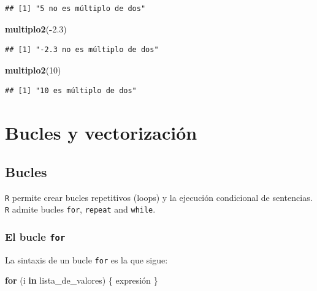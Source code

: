 \documentclass[]{book}
\newenvironment{Shaded}{\begin{snugshade}}{\end{snugshade}}
\newcommand{\KeywordTok}[1]{\textcolor[rgb]{0.13,0.29,0.53}{\textbf{#1}}}
\newcommand{\DecValTok}[1]{\textcolor[rgb]{0.00,0.00,0.81}{#1}}
\newcommand{\FloatTok}[1]{\textcolor[rgb]{0.00,0.00,0.81}{#1}}
\newcommand{\ControlFlowTok}[1]{\textcolor[rgb]{0.13,0.29,0.53}{\textbf{#1}}}
\newcommand{\OperatorTok}[1]{\textcolor[rgb]{0.81,0.36,0.00}{\textbf{#1}}}
\newcommand{\NormalTok}[1]{#1}
\begin{document}
\begin{verbatim}
## [1] "5 no es múltiplo de dos"
\end{verbatim}

\begin{Shaded}
\begin{Highlighting}[]
\KeywordTok{multiplo2}\NormalTok{(}\OperatorTok{-}\FloatTok{2.3}\NormalTok{)}
\end{Highlighting}
\end{Shaded}

\begin{verbatim}
## [1] "-2.3 no es múltiplo de dos"
\end{verbatim}

\begin{Shaded}
\begin{Highlighting}[]
\KeywordTok{multiplo2}\NormalTok{(}\DecValTok{10}\NormalTok{)}
\end{Highlighting}
\end{Shaded}

\begin{verbatim}
## [1] "10 es múltiplo de dos"
\end{verbatim}

\section{Bucles y vectorización}\label{bucles-y-vectorizacion}

\subsection{Bucles}\label{bucles}

\texttt{R} permite crear bucles repetitivos (loops) y la ejecución
condicional de sentencias. \texttt{R} admite bucles \texttt{for},
\texttt{repeat} and \texttt{while}.

\subsubsection{\texorpdfstring{El bucle
\texttt{for}}{El bucle for}}\label{el-bucle-for}

La sintaxis de un bucle \texttt{for} es la que sigue:

\begin{Shaded}
\begin{Highlighting}[]
\ControlFlowTok{for}\NormalTok{ (i }\ControlFlowTok{in}\NormalTok{ lista_de_valores)  \{ expresión \}}
\end{Highlighting}
\end{Shaded}
\end{document}
